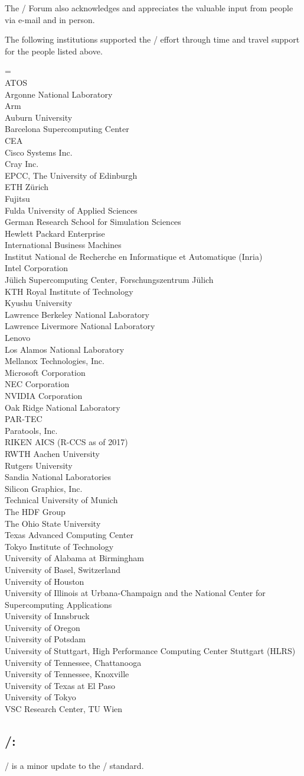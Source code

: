 The \MPI/ Forum also acknowledges and appreciates the valuable input
from people via e-mail and in person.


The following institutions supported the \MPIIVDOTO/ effort through
time and travel support for the people listed above.

\medskip

\begin{obeylines}\leftskip=\parindent\parindent=0pt %
ATOS
Argonne National Laboratory
Arm
Auburn University
Barcelona Supercomputing Center
CEA
Cisco Systems Inc.
Cray Inc.
EPCC, The University of Edinburgh
ETH Z\"urich
Fujitsu
Fulda University of Applied Sciences
German Research School for Simulation Sciences
Hewlett Packard Enterprise
International Business Machines
Institut National de Recherche en Informatique et Automatique (Inria)
Intel Corporation
J\"ulich Supercomputing Center, Forschungszentrum J\"ulich
KTH Royal Institute of Technology
Kyushu University
Lawrence Berkeley National Laboratory
Lawrence Livermore National Laboratory
Lenovo
Los Alamos National Laboratory
Mellanox Technologies, Inc.
Microsoft Corporation
NEC Corporation
NVIDIA Corporation
Oak Ridge National Laboratory
PAR-TEC
Paratools, Inc.
RIKEN AICS (R-CCS as of 2017)
RWTH Aachen University
Rutgers University
Sandia National Laboratories
Silicon Graphics, Inc.
Technical University of Munich
The HDF Group
The Ohio State University
Texas Advanced Computing Center
Tokyo Institute of Technology
University of Alabama at Birmingham
University of Basel, Switzerland
University of Houston
University of Illinois at Urbana-Champaign and the National Center for Supercomputing Applications
University of Innsbruck
University of Oregon
University of Potsdam
University of Stuttgart, High Performance Computing Center Stuttgart (HLRS)
University of Tennessee, Chattanooga
University of Tennessee, Knoxville
University of Texas at El Paso
University of Tokyo
VSC Research Center, TU Wien
\end{obeylines}

\subsection*{\MPIIVDOTI/:}
\MPIIVDOTI/ is a minor update to the \MPI/ standard.

